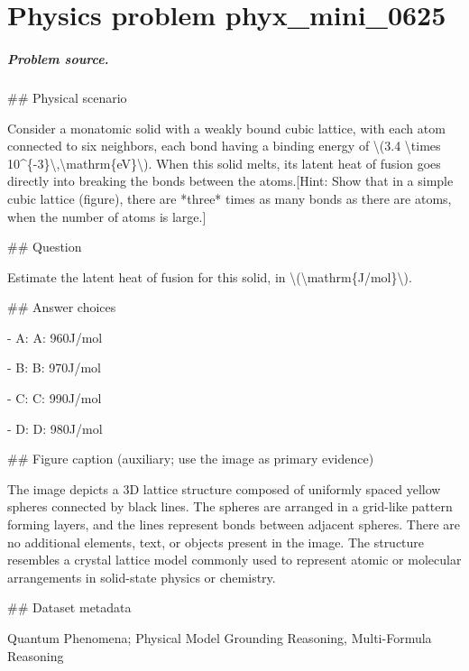
\chapter{Physics problem phyx\_mini\_0625}
\label{ch:PhyXMiniProblems_problem_phyx_mini_0625}

\paragraph{Problem source.}
\#\# Physical scenario

Consider a monatomic solid with a weakly bound cubic lattice, with each atom connected to six neighbors, each bond having a binding energy of \textbackslash{}(3.4 \textbackslash{}times 10\textasciicircum{}\{-3\}\textbackslash{},\textbackslash{}mathrm\{eV\}\textbackslash{}). When this solid melts, its latent heat of fusion goes directly into breaking the bonds between the atoms.[Hint: Show that in a simple cubic lattice (figure), there are *three* times as many bonds as there are atoms, when the number of atoms is large.]

\#\# Question

Estimate the latent heat of fusion for this solid, in \textbackslash{}(\textbackslash{}mathrm\{J/mol\}\textbackslash{}).

\#\# Answer choices

- A: A: 960J/mol

- B: B: 970J/mol

- C: C: 990J/mol

- D: D: 980J/mol

\#\# Figure caption (auxiliary; use the image as primary evidence)

The image depicts a 3D lattice structure composed of uniformly spaced yellow spheres connected by black lines. The spheres are arranged in a grid-like pattern forming layers, and the lines represent bonds between adjacent spheres. There are no additional elements, text, or objects present in the image. The structure resembles a crystal lattice model commonly used to represent atomic or molecular arrangements in solid-state physics or chemistry.

\#\# Dataset metadata

Quantum Phenomena; Physical Model Grounding Reasoning, Multi-Formula Reasoning

